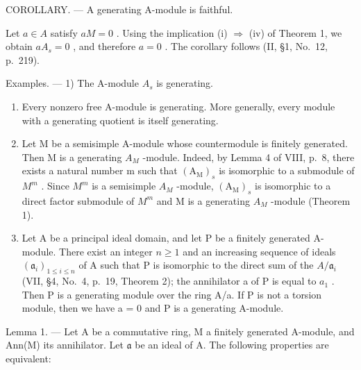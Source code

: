 COROLLARY. --- A generating A-module is faithful.

Let \(a \in A\) satisfy \(aM = 0\) . Using the implication (i) \(\Rightarrow\) (iv) of Theorem 1, we obtain \(aA_s = 0\) , and therefore \(a = 0\) . The corollary follows (II, §1, No.~12, p.~219).

Examples. --- 1) The A-module \(A_s\) is generating.

\begin{enumerate}
\def\labelenumi{\arabic{enumi})}
\setcounter{enumi}{1}
\item
  Every nonzero free A-module is generating. More generally, every module with a generating quotient is itself generating.
\item
  Let M be a semisimple A-module whose countermodule is finitely generated. Then M is a generating \(A_{M}\) -module. Indeed, by Lemma 4 of VIII, p.~8, there exists a natural number m such that \((\mathrm{A}_{\mathrm{M}})_{s}\) is isomorphic to a submodule of \(M^{m}\) . Since \(M^{m}\) is a semisimple \(A_{M}\) -module, \((\mathrm{A}_{\mathrm{M}})_{s}\) is isomorphic to a direct factor submodule of \(M^{m}\) and M is a generating \(A_{M}\) -module (Theorem 1).
\item
  Let A be a principal ideal domain, and let P be a finitely generated A-module. There exist an integer \(n \geqslant 1\) and an increasing sequence of ideals \((\mathfrak{a}_{i})_{1 \leqslant i \leqslant n}\) of A such that P is isomorphic to the direct sum of the \(A/\mathfrak{a}_{i}\) (VII, §4, No.~4, p.~19, Theorem 2); the annihilator a of P is equal to \(a_{1}\) . Then P is a generating module over the ring A/a. If P is not a torsion module, then we have a = 0 and P is a generating A-module.
\end{enumerate}

Lemma 1. --- Let A be a commutative ring, M a finitely generated A-module, and Ann(M) its annihilator. Let \(\mathfrak{a}\) be an ideal of A. The following properties are equivalent:

